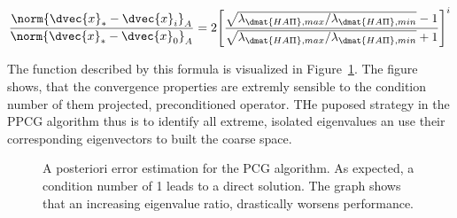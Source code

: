 \begin{align}
\frac{\norm{\dvec{x}_*-\dvec{x}_i   }_A}{\norm{\dvec{x}_*-\dvec{x}_0}_A} =
2 \Bigg [ \frac{ \sqrt{\lambda_{\dmat{H A \Pi},max}/\lambda_{\dmat{H A \Pi},min}}-1 }{ \sqrt{\lambda_{\dmat{H A \Pi},max}/\lambda_{\dmat{H A \Pi},min}}+1 } \Bigg ]^i
\end{align}

The function described by this formula is visualized in Figure~\ref{fig:error_estimation_pcg}. The figure shows, that the convergence properties are extremly sensible to the condition number of them projected, preconditioned operator. THe puposed strategy in the PPCG algorithm thus is to identify all extreme, isolated eigenvalues an use their corresponding eigenvectors to built the coarse space.
\begin{figure}[h!]
	\begin{center}
        
        \caption[A posteriror error estimation PCG]{A posteriori error estimation for the PCG algorithm. As expected, a condition number of 1 leads to a direct solution. The graph shows that an increasing eigenvalue ratio, drastically worsens performance.}
		\label{fig:error_estimation_pcg}
    \end{center}
\end{figure}


